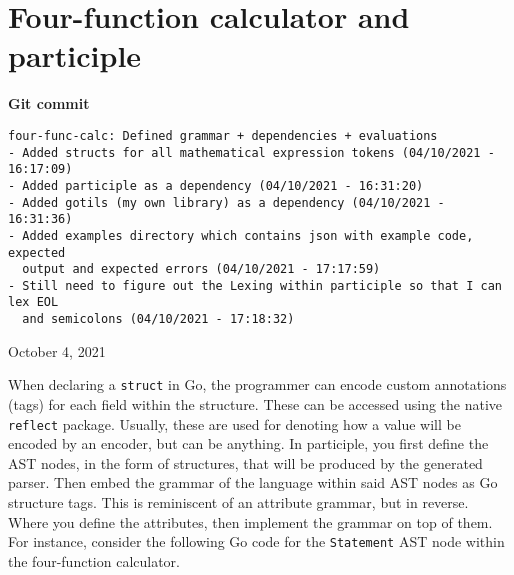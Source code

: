 \section{Four-function calculator and participle}
\label{sec:four-function-calc}

\begin{center}
    \textbf{Git commit}
    \begin{verbatim}
four-func-calc: Defined grammar + dependencies + evaluations
- Added structs for all mathematical expression tokens (04/10/2021 - 16:17:09)
- Added participle as a dependency (04/10/2021 - 16:31:20)
- Added gotils (my own library) as a dependency (04/10/2021 - 16:31:36)
- Added examples directory which contains json with example code, expected
  output and expected errors (04/10/2021 - 17:17:59)
- Still need to figure out the Lexing within participle so that I can lex EOL
  and semicolons (04/10/2021 - 17:18:32)
    \end{verbatim}
    \vspace{-1em}
    \tiny{October 4, 2021}
\end{center}

When declaring a \texttt{struct} in Go, the programmer can encode custom annotations (tags) for each field within the structure. These can be accessed using the native \verb|reflect| package. Usually, these are used for denoting how a value will be encoded by an encoder, but can be anything. In participle, you first define the AST nodes, in the form of structures, that will be produced by the generated parser. Then embed the grammar of the language within said AST nodes as Go structure tags. This is reminiscent of an attribute grammar, but in reverse. Where you define the attributes, then implement the grammar on top of them. For instance, consider the following Go code for the \verb|Statement| AST node within the four-function calculator.

